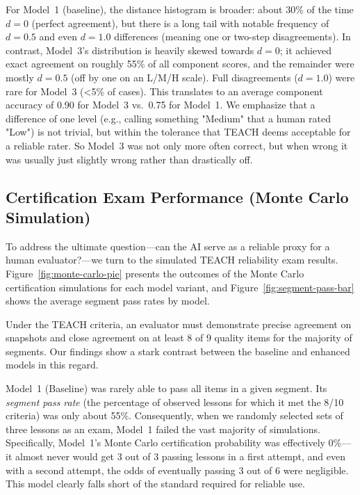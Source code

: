 \documentclass[12pt]{article}
\begin{document}
For Model~1 (baseline), the distance histogram is broader: about 30\% of the time \(d=0\) (perfect agreement), but there is a long tail with notable frequency of \(d=0.5\) and even \(d=1.0\) differences (meaning one or two-step disagreements). In contrast, Model~3's distribution is heavily skewed towards \(d=0\); it achieved exact agreement on roughly 55\% of all component scores, and the remainder were mostly \(d=0.5\) (off by one on an L/M/H scale). Full disagreements (\(d=1.0\)) were rare for Model~3 (<5\% of cases). This translates to an average component accuracy of 0.90 for Model~3 vs.\ 0.75 for Model~1. We emphasize that a difference of one level (e.g., calling something "Medium" that a human rated "Low") is not trivial, but within the tolerance that TEACH deems acceptable for a reliable rater. So Model~3 was not only more often correct, but when wrong it was usually just slightly wrong rather than drastically off.

\subsection{Certification Exam Performance (Monte Carlo Simulation)}
To address the ultimate question—can the AI serve as a reliable proxy for a human evaluator?—we turn to the simulated TEACH reliability exam results. Figure~\ref{fig:monte-carlo-pie} presents the outcomes of the Monte Carlo certification simulations for each model variant, and Figure~\ref{fig:segment-pass-bar} shows the average segment pass rates by model.

Under the TEACH criteria, an evaluator must demonstrate precise agreement on snapshots and close agreement on at least 8 of 9 quality items for the majority of segments. Our findings show a stark contrast between the baseline and enhanced models in this regard.

Model~1 (Baseline) was rarely able to pass all items in a given segment. Its \textit{segment pass rate} (the percentage of observed lessons for which it met the 8/10 criteria) was only about 55\%. Consequently, when we randomly selected sets of three lessons as an exam, Model~1 failed the vast majority of simulations. Specifically, Model~1’s Monte Carlo certification probability was effectively 0\%—it almost never would get 3 out of 3 passing lessons in a first attempt, and even with a second attempt, the odds of eventually passing 3 out of 6 were negligible. This model clearly falls short of the standard required for reliable use.
\end{document}
